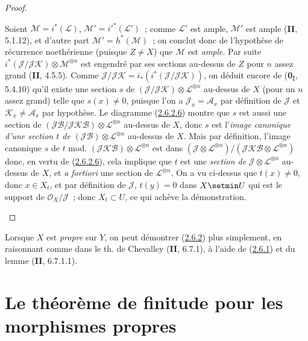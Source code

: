 \begin{proof}
\begin{env}[2.6.2.5]
Soient $\mathcal M=i^*(\mathcal L)$, $\mathcal M'=i'^*(\mathcal L')$~;
comme $\mathcal L'$ est ample, $\mathcal M'$ est ample (\textbf{II}, 5.1.12), et
d'autre part $\mathcal M'=h^*(\mathcal M)$~; on conclut donc de
l'hypothèse de récurrence noethérienne (puisque $Z\neq X$) que
$\mathcal M$ est \emph{ample}. Par suite
$i^*(\mathcal J/\mathcal J\mathcal K)\otimes\mathcal M^{\otimes n}$ est
engendré par ses sections au-dessus de $Z$ pour $n$ assez grand
(\textbf{II}, 4.5.5). Comme
$\mathcal J/\mathcal J\mathcal K=i_*(i^*(\mathcal J/\mathcal J\mathcal K))$,
on déduit encore de (\textbf{0}\textsubscript{I}, 5.4.10) qu'il existe une section
$s$ de $(\mathcal J/\mathcal J\mathcal K)\otimes
\mathcal L^{\otimes n}$ au-dessus de $X$ (pour un $n$ assez grand) telle
que $s(x)\neq0$, puisque l'on a $\mathcal J_x=\mathcal A_x$ par
définition de $\mathcal J$ et $\mathcal K_x\neq\mathcal A_x$ par
hypothèse. Le diagramme (\hyperref[III.2.6.2.6-fr]{2.6.2.6}) montre que
$s$ est aussi une section de
$(\mathcal J\mathcal B/\mathcal J\mathcal K\mathcal B)
\otimes\mathcal L^{\otimes n}$ au-dessus de $X$, donc $s$ est l'\emph{image
canonique d'une section $t$ de}
$(\mathcal J\mathcal B)\otimes\mathcal L^{\otimes n}$ au-dessus de $X$.
Mais par définition, l'image canonique $s$ de $t$ mod.
$(\mathcal J\mathcal K\mathcal B)\otimes\mathcal L^{\otimes n}$ est
dans
$(\mathcal J\otimes\mathcal L^{\otimes n})/
(\mathcal J\mathcal K\mathcal B\otimes\mathcal L^{\otimes n})$
donc, en vertu de (\hyperref[III.2.6.2.6-fr]{2.6.2.6}), cela implique que
$t$ est une \emph{section de} $\mathcal J\otimes\mathcal L^{\otimes n}$
au-dessus de $X$, et \emph{a fortiori} une section de
$\mathcal L^{\otimes n}$. On a vu ci-dessus que $t(x)\neq0$, donc
$x\in X_t$, et par définition de $\mathcal J$, $t(y)=0$ dans $X\setmin U$ qui
est le support de $\mathcal O_X/\mathcal J$~; donc $X_t\subset U$, ce qui
achève la démonstration.
\end{env}
\end{proof}

\begin{remark}[2.6.3]
\label{III.2.6.3-fr}
\upshape Lorsque $X$ est \emph{propre} sur $Y$, on peut démontrer
(\hyperref[III.2.6.2-fr]{2.6.2}) plus simplement, en raisonnant comme dans
le th. de Chevalley (\textbf{II}, 6.7.1), à l'aide de
(\hyperref[III.2.6.1-fr]{2.6.1}) et du lemme (\textbf{II}, 6.7.1.1).
\end{remark}

\section{Le théorème de finitude pour les morphismes propres}
\label{section:III.3-fr}

